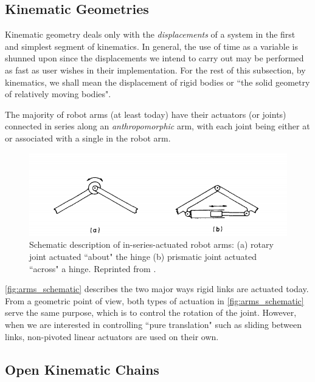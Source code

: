  \subsection{Kinematic Geometries}
 Kinematic geometry deals only with the \textit{displacements} of a system in the first and simplest segment of kinematics.  In general, the use of time as a variable is shunned upon since the displacements we intend to carry out may be performed as fast as user wishes in their implementation.  For the rest of this subsection, by kinematics, we shall mean the displacement of rigid bodies or ``the solid geometry of relatively moving bodies". 
 
 The majority of robot arms (at least today) have their actuators (or joints) connected in series along an \textit{anthropomorphic} arm, with each joint being either at or associated with a single \dof in the robot arm. 
\begin{figure}[tb!]
	\centering
	\includegraphics[width=\columnwidth]{figures/arms_hunt.png}
	\caption{Schematic description of in-series-actuated robot arms: (a) rotary joint actuated ``about" the hinge (b) prismatic joint actuated ``across" a hinge. Reprinted from \cite{Hunt1983}.}
	\label{fig:arms_schematic}
\end{figure}
%
\autoref{fig:arms_schematic} describes the two major ways rigid links are actuated today. From a geometric point of view, both types of actuation in \autoref{fig:arms_schematic} serve the same purpose, which is to control the rotation of the joint. However, when we are interested in controlling ``pure translation" such as sliding between links, non-pivoted linear actuators are used on their own. 


\subsection{Open Kinematic Chains}

